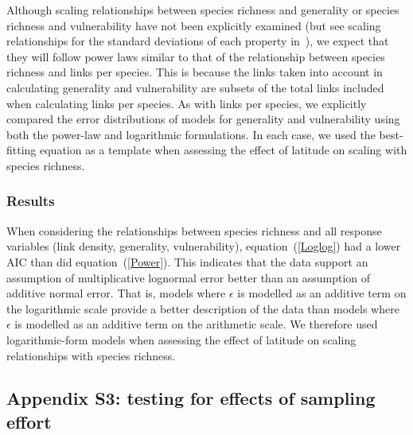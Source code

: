 \documentclass[12pt]{article}
\begin{document}
    Although scaling relationships between species richness and generality or
    species richness and vulnerability have not been explicitly examined (but see scaling 
    relationships for the standard deviations of each property in~\cite{Riede2010}), we expect that they will follow
    power laws similar to that of the relationship between species richness and links per species.
    This is because the links taken into account in calculating generality and vulnerability are subsets 
    of the total links included when calculating links per species. As with links per species, we explicitly 
    compared the error distributions of models for generality and vulnerability using
    both the power-law and logarithmic formulations. 
    In each case, we used the best-fitting equation as a template when assessing the effect of latitude on scaling with
    species richness. 


  \subsubsection*{Results}

    When considering the relationships between species richness and all response variables 
    (link density, generality, vulnerability), equation~(\ref{Loglog}) had a
    lower AIC than did equation~(\ref{Power}). This indicates that the
    data support an assumption of multiplicative lognormal error better than an
    assumption of additive normal error. That is, models where $\epsilon$ is
    modelled as an additive term on
    the logarithmic scale provide a better description of the data than models
    where $\epsilon$ is modelled as an additive term on the arithmetic scale.  
    We therefore used logarithmic-form models when assessing the
    effect of latitude on scaling relationships  with species richness.

\newpage

\subsection*{Appendix S3: testing for effects of sampling effort}
\end{document}
